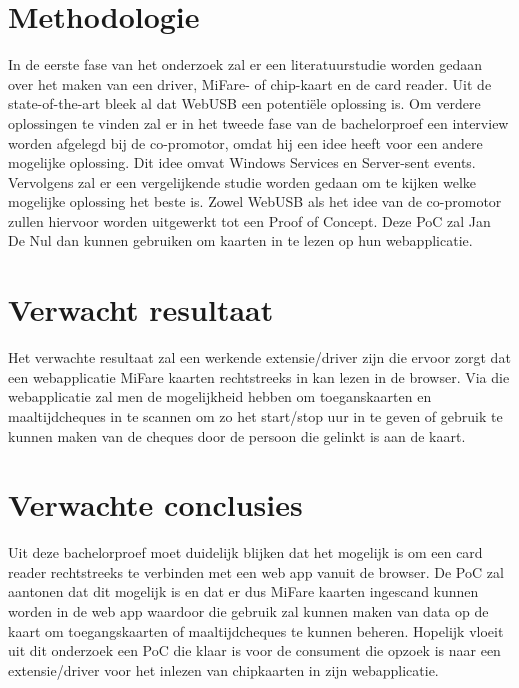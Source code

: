 \section{Methodologie}%
\label{sec:methodologie}

In de eerste fase van het onderzoek zal er een literatuurstudie worden gedaan over het maken van een driver, MiFare- of chip-kaart en de card reader. Uit de state-of-the-art bleek al dat WebUSB een potentiële oplossing is. Om verdere oplossingen te vinden zal er in het tweede fase van de bachelorproef een interview worden afgelegd bij de co-promotor, omdat hij een idee heeft voor een andere mogelijke oplossing. Dit idee omvat Windows Services en Server-sent events. Vervolgens zal er een vergelijkende studie worden gedaan om te kijken welke mogelijke oplossing het beste is. Zowel WebUSB als het idee van de co-promotor zullen hiervoor worden uitgewerkt tot een Proof of Concept. Deze PoC zal Jan De Nul dan kunnen gebruiken om kaarten in te lezen op hun webapplicatie.

\section{Verwacht resultaat}%
\label{sec:verwachte_resultaten}

Het verwachte resultaat zal een werkende extensie/driver zijn die ervoor zorgt dat een webapplicatie MiFare kaarten rechtstreeks in kan lezen in de browser. Via die webapplicatie zal men de mogelijkheid hebben om toeganskaarten en maaltijdcheques in te scannen om zo het start/stop uur in te geven of gebruik te kunnen maken van de cheques door de persoon die gelinkt is aan de kaart.

\section{Verwachte conclusies}%
\label{sec:Verwachte_conclusies}

Uit deze bachelorproef moet duidelijk blijken dat het mogelijk is om een card reader rechtstreeks te verbinden met een web app vanuit de browser. De PoC zal aantonen dat dit mogelijk is en dat er dus MiFare kaarten ingescand kunnen worden in de web app waardoor die gebruik zal kunnen maken van data op de kaart om toegangskaarten of maaltijdcheques te kunnen beheren. Hopelijk vloeit uit dit onderzoek een PoC die klaar is voor de consument die opzoek is naar een extensie/driver voor het inlezen van chipkaarten in zijn webapplicatie.